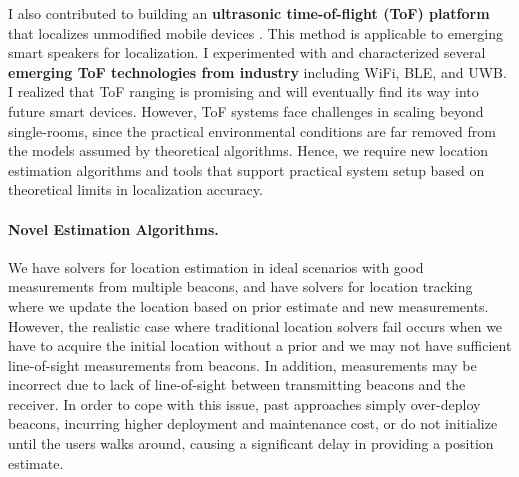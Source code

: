 \documentclass[10pt]{article}
\begin{document}
I also contributed to building an \textbf{ultrasonic time-of-flight (ToF) platform} that localizes unmodified mobile devices \cite{rtas-alps-platform, lazik2015alps,lazik2015alpsdemo}. This method is applicable to emerging smart speakers for localization. I experimented with and characterized several \textbf{emerging ToF technologies from industry} including WiFi, BLE, and UWB. %
I realized that ToF ranging is promising and will eventually find its way into future smart devices.  However, ToF systems face challenges in scaling beyond single-rooms, since the practical environmental conditions are far removed from the models assumed by theoretical algorithms. Hence, we require new location estimation algorithms and tools that support practical system setup based on theoretical limits in localization accuracy. %


\paragraph{Novel Estimation Algorithms. } 
We have solvers for location estimation in ideal scenarios with good measurements from multiple beacons, and have solvers for location tracking where we update the location based on prior estimate and new measurements. However, the realistic case where traditional location solvers fail occurs when we have to acquire the initial location without a prior and we may not have sufficient line-of-sight measurements from beacons. In addition, measurements may be incorrect due to lack of line-of-sight between transmitting beacons and the receiver. In order to cope with this issue, past approaches simply over-deploy beacons, incurring higher deployment and maintenance cost, or do not initialize until the users walks around, causing a significant delay in providing a position estimate.
\end{document}
